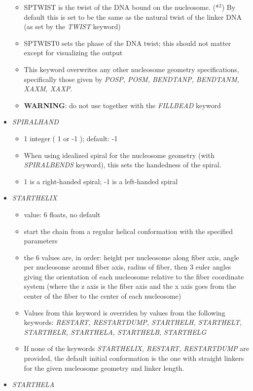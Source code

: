 \documentclass[12pt,dvips]{article}
\begin{document}
\begin{itemize}
\begin{itemize}
  \item SPTWIST is the twist of the DNA bound on the nucleosome. (*$^2$) By default this is set to be the same as the natural twist of the linker DNA (as set by the {\em TWIST} keyword)
  \item SPTWIST0 sets the phase of the DNA twist; this should not matter except for visualizing the output
  \item This keyword overwrites any other nucleosome geometry specifications, specifically those given by {\em POSP, POSM, BENDTANP, BENDTANM, XAXM, XAXP}.
  \item {\bf WARNING}: do not use together with the {\em FILLBEAD} keyword
  \end{itemize}
%
\item {\it SPIRALHAND}
  \begin{itemize}
  \item 1 integer ( 1 or -1 ); default: -1
  \item When using idealized spiral for the nucleosome geometry (with {\em SPIRALBENDS} keyword), this sets the handedness of the spiral.
  \item 1 is a right-handed spiral; -1 is a left-handed spiral
  \end{itemize}
%
\item {\it STARTHELIX}
  \begin{itemize}
    \item value: 6 floats, no default
    \item start the chain from a regular helical conformation with the specified parameters
    \item the 6 values are, in order: height per nucleosome along fiber axis, angle per nucleosome around fiber axis, radius of fiber, then 3 euler angles giving the orientation of each nucleosome relative to the fiber coordinate system (where the z axis is the fiber axis and the x axis goes from the center of the fiber to the center of each nucleosome)
    \item Values from this keyword is overriden by values from the following keywords: {\em RESTART, RESTARTDUMP, STARTHELH, STARTHELT, STARTHELR, STARTHELA, STARTHELB, STARTHELG}
    \item If none of the keywords {\em STARTHELIX, RESTART, RESTARTDUMP} are provided, the default initial conformation is the one with straight linkers for the given nucleosome geometry and linker length.
  \end{itemize}
%
\item {\it STARTHELA}
  \begin{itemize}

\end{itemize}
\end{itemize}
\end{document}
